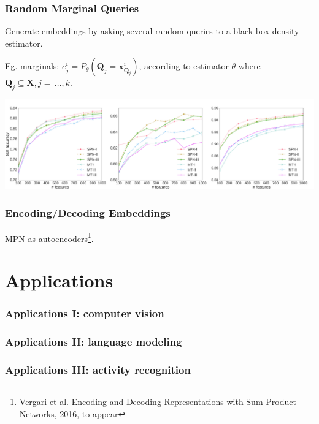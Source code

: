 \documentclass[10pt, t, xcolor={usenames,dvipsnames,svgnames}, compress]{beamer}
\begin{document}
\begin{frame}
  \frametitle{Random Marginal Queries}
  Generate embeddings by asking several random queries to a black box
  density estimator.\par
  Eg. marginals: $e^{i}_{j}=P_{\theta}(\mathbf{Q}_{j}=\mathbf{x}^{i}_{\mathbf{Q}_{j}})$,
  according to estimator $\theta$ where $\mathbf{Q}_{j}\subseteq\mathbf{X}, j=\,\dots,k$.
  \begin{center}
    \includegraphics[width=1.0\linewidth]{figures/lines-wide}
  \end{center}
\end{frame}

\begin{frame}
  \frametitle{Encoding/Decoding Embeddings}
  MPN as autoencoders\footnote{Vergari et al. Encoding and Decoding
    Representations with Sum-Product Networks, 2016, to appear}.
\end{frame}




\section{Applications}
{
  \begin{frame}[c]
    \sectionpage
  \end{frame}
}

\begin{frame}
  \frametitle{Applications I: computer vision}
  
\end{frame}


\begin{frame}
  \frametitle{Applications II: language modeling}
  
\end{frame}

\begin{frame}
  \frametitle{Applications III: activity recognition}
\end{frame}
\end{document}
